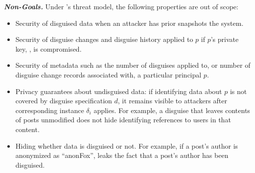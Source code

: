 \vspace{6pt}\noindent\textbf{\emph{Non-Goals.}}
%
Under \sys's threat model, the following properties are out of scope:
%
\begin{itemize}
    \item Security of disguised data when an attacker has prior snapshots the system.
    \item Security of disguise changes and disguise history applied to $p$ if $p$'s private key, , is compromised.
    \item Security of metadata such as the number of disguises applied to, or number of
	disguise change records associated with, a particular principal $p$.
    \item Privacy guarantees about undisguised data: if identifying data about $p$ is not covered by
        disguise specification $d$, it remains visible to attackers after corresponding instance $\delta_i$ applies.
        For example, a disguise that leaves contents of posts unmodified does not hide identifying references
	to users in that content.
    \item Hiding whether data is disguised or not. For example, if a post's author is anonymized as ``anonFox'',
        \sys leaks the fact that a post's author has been disguised.
\end{itemize}

